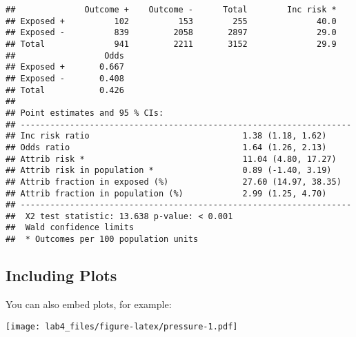 \documentclass[]{article}
\begin{document}
\begin{verbatim}
##              Outcome +    Outcome -      Total        Inc risk *
## Exposed +          102          153        255              40.0
## Exposed -          839         2058       2897              29.0
## Total              941         2211       3152              29.9
##                  Odds
## Exposed +       0.667
## Exposed -       0.408
## Total           0.426
## 
## Point estimates and 95 % CIs:
## -------------------------------------------------------------------
## Inc risk ratio                               1.38 (1.18, 1.62)
## Odds ratio                                   1.64 (1.26, 2.13)
## Attrib risk *                                11.04 (4.80, 17.27)
## Attrib risk in population *                  0.89 (-1.40, 3.19)
## Attrib fraction in exposed (%)               27.60 (14.97, 38.35)
## Attrib fraction in population (%)            2.99 (1.25, 4.70)
## -------------------------------------------------------------------
##  X2 test statistic: 13.638 p-value: < 0.001
##  Wald confidence limits
##  * Outcomes per 100 population units
\end{verbatim}

\subsection{Including Plots}\label{including-plots}

You can also embed plots, for example:

\texttt{[image: lab4\_files/figure-latex/pressure-1.pdf]}
\end{document}
